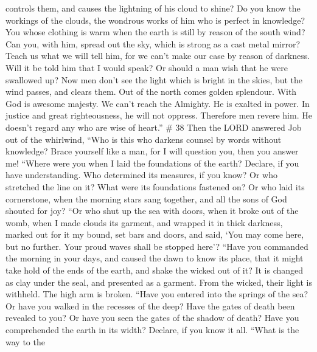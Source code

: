 controls them, and causes the lightning of his cloud to shine?
 Do you know the workings of the clouds, the wondrous
works of him who is perfect in knowledge?  You whose
clothing is warm when the earth is still by reason of the south wind?
 Can you, with him, spread out the sky, which is strong
as a cast metal mirror?  Teach us what we will tell him,
for we can't make our case by reason of darkness.  Will
it be told him that I would speak? Or should a man wish that he were
swallowed up?  Now men don't see the light which is
bright in the skies, but the wind passes, and clears them.
 Out of the north comes golden splendour. With God is
awesome majesty.  We can't reach the Almighty. He is
exalted in power. In justice and great righteousness, he will not
oppress.  Therefore men revere him. He doesn't regard any
who are wise of heart.'' \# 38  Then the LORD answered Job
out of the whirlwind,  ``Who is this who darkens counsel
by words without knowledge?  Brace yourself like a man,
for I will question you, then you answer me!  ``Where were
you when I laid the foundations of the earth? Declare, if you have
understanding.  Who determined its measures, if you know?
Or who stretched the line on it?  What were its
foundations fastened on? Or who laid its cornerstone, 
when the morning stars sang together, and all the sons of God shouted
for joy?  ``Or who shut up the sea with doors, when it
broke out of the womb,  when I made clouds its garment,
and wrapped it in thick darkness,  marked out for it my
bound, set bars and doors,  and said, `You may come here,
but no further. Your proud waves shall be stopped here'? 
``Have you commanded the morning in your days, and caused the dawn to
know its place,  that it might take hold of the ends of
the earth, and shake the wicked out of it?  It is changed
as clay under the seal, and presented as a garment.  From
the wicked, their light is withheld. The high arm is broken.
 ``Have you entered into the springs of the sea? Or have
you walked in the recesses of the deep?  Have the gates
of death been revealed to you? Or have you seen the gates of the shadow
of death?  Have you comprehended the earth in its width?
Declare, if you know it all.  ``What is the way to the
